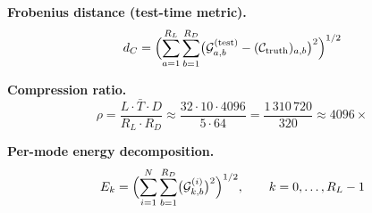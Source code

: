 \documentclass[11pt,a4paper]{article}
\begin{document}
\noindent
\textbf{Frobenius distance (test-time metric).}
\begin{equation}
d_C = \Bigl(\sum_{a=1}^{R_L}\sum_{b=1}^{R_D}
      \bigl(\mathcal{G}^{(\text{test})}_{a,b}
          - (\mathcal{C}_{\text{truth}})_{a,b}\bigr)^2
      \Bigr)^{1/2}
\end{equation}

\noindent
\textbf{Compression ratio.}
\begin{equation}
\rho = \frac{L \cdot \bar{T} \cdot D}{R_L \cdot R_D}
     \approx \frac{32 \cdot 10 \cdot 4096}{5 \cdot 64}
     = \frac{1\,310\,720}{320} \approx 4096\times
\end{equation}

\noindent
\textbf{Per-mode energy decomposition.}
\begin{equation}
E_k = \Bigl(\sum_{i=1}^{N} \sum_{b=1}^{R_D}
      \bigl(\mathcal{G}^{(i)}_{k,b}\bigr)^2\Bigr)^{1/2},
\qquad k = 0,\dots,R_L-1
\end{equation}
\end{document}
